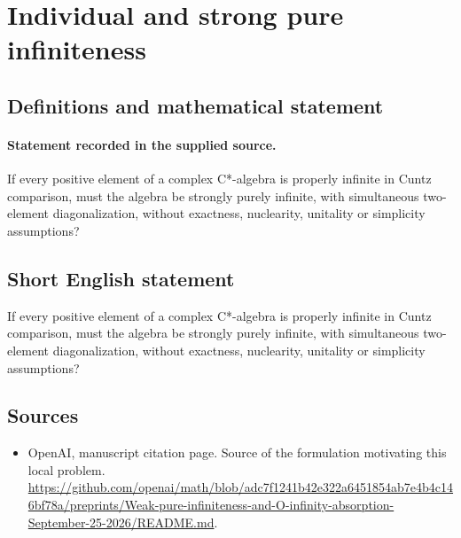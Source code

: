 \documentclass[11pt]{article}
\begin{document}
\section*{Individual and strong pure infiniteness}\label{30007301}
\subsection{Definitions and mathematical statement}
\paragraph{Statement recorded in the supplied source.}
If every positive element of a complex C*-algebra is properly infinite in Cuntz comparison, must the algebra be strongly purely infinite, with simultaneous two-element diagonalization, without exactness, nuclearity, unitality or simplicity assumptions?
\subsection{Short English statement}
If every positive element of a complex C*-algebra is properly infinite in Cuntz comparison, must the algebra be strongly purely infinite, with simultaneous two-element diagonalization, without exactness, nuclearity, unitality or simplicity assumptions?
\subsection{Sources}
\begin{itemize}
\item[S1] OpenAI, manuscript citation page. Source of the formulation motivating this local problem.
\url{https://github.com/openai/math/blob/adc7f1241b42e322a6451854ab7e4b4c146bf78a/preprints/Weak-pure-infiniteness-and-O-infinity-absorption-September-25-2026/README.md}.
\end{itemize}
\end{document}
